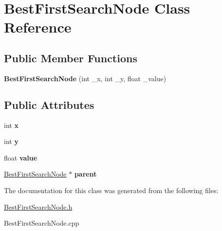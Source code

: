 \hypertarget{class_best_first_search_node}{\section{Best\-First\-Search\-Node Class Reference}
\label{class_best_first_search_node}
}
\subsection*{Public Member Functions}
\begin{DoxyCompactItemize}
\item 
\hypertarget{class_best_first_search_node_a1cd7fed5137486ac7d9d094dce42bb19}{{\bfseries Best\-First\-Search\-Node} (int \-\_\-x, int \-\_\-y, float \-\_\-value)}\label{class_best_first_search_node_a1cd7fed5137486ac7d9d094dce42bb19}

\end{DoxyCompactItemize}
\subsection*{Public Attributes}
\begin{DoxyCompactItemize}
\item 
\hypertarget{class_best_first_search_node_a4ba80f57afb57faf466c211e8bb5cc2e}{int {\bfseries x}}\label{class_best_first_search_node_a4ba80f57afb57faf466c211e8bb5cc2e}

\item 
\hypertarget{class_best_first_search_node_a1c54551036788f22f527e689b39cb20a}{int {\bfseries y}}\label{class_best_first_search_node_a1c54551036788f22f527e689b39cb20a}

\item 
\hypertarget{class_best_first_search_node_a243563a977ea151d647c72baf705abde}{float {\bfseries value}}\label{class_best_first_search_node_a243563a977ea151d647c72baf705abde}

\item 
\hypertarget{class_best_first_search_node_a97b2201c0376c6294ca6de30755ab22e}{\hyperlink{class_best_first_search_node}{Best\-First\-Search\-Node} $\ast$ {\bfseries parent}}\label{class_best_first_search_node_a97b2201c0376c6294ca6de30755ab22e}

\end{DoxyCompactItemize}


The documentation for this class was generated from the following files\-:\begin{DoxyCompactItemize}
\item 
\hyperlink{_best_first_search_node_8h}{Best\-First\-Search\-Node.\-h}\item 
Best\-First\-Search\-Node.\-cpp\end{DoxyCompactItemize}
